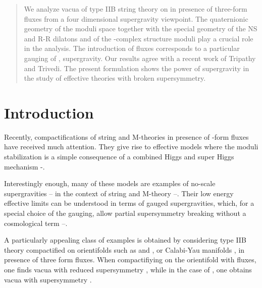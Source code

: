 \documentclass[a4paper,12pt]{article}
\begin{document}
\begin{abstract}
We analyze \coordHE{} vacua of type IIB string theory on \coordHE{} in presence of three-form fluxes from a four
dimensional supergravity viewpoint. The quaternionic geometry of
the \myHighlight{$\K$}\coordHE{} moduli space together with the special geometry of the NS
and R-R dilatons and of the \coordHE{}-complex structure moduli play a
crucial role in the analysis. The introduction of fluxes
corresponds to a particular gauging of \coordHE{}, \coordHE{} supergravity.
Our results agree with a recent work of Tripathy and Trivedi. The
present formulation shows the power of supergravity  in the study
of effective theories with broken supersymmetry.
\end{abstract}


\vfill\eject


\section{Introduction}

Recently, compactifications of string and M-theories in presence
of \coordHE{}-form fluxes have received much attention. They give rise to
effective models where the moduli stabilization is a simple
consequence of a combined Higgs and super Higgs mechanism
\cite{ps}-\cite{tt}.

Interestingly enough, many of these models are examples of
no-scale supergravities  \cite{cfkn}--\cite{ckpdfwg} in the
context of string and M-theory \cite{tv}\cite{cklt}--\cite{lm}.
Their low energy effective limits can be understood in terms  of
gauged supergravities, which, for a special choice of the gauging,
allow partial supersymmetry breaking without a cosmological term
\cite{adflf,adfld}\cite{cgp}--\cite{tz}.

A particularly appealing class of examples is obtained by
considering type IIB theory compactified on orientifolds such as
\coordHE{} \cite{fp,kst,dfv,dflv,adflq} and \coordHE{}\cite{tt}, or Calabi-Yau manifolds
\cite{ps,tv,ma,lm,da}, in presence of three form fluxes. When
compactifiying on the orientifold \coordHE{} with fluxes, one
finds vacua with reduced supersymmetry \coordHE{} \cite{fp,kst,
dfv,dflv}, while in the case of \coordHE{}, one obtains
vacua with \coordHE{} supersymmetry \cite{tt}.
\end{document}
